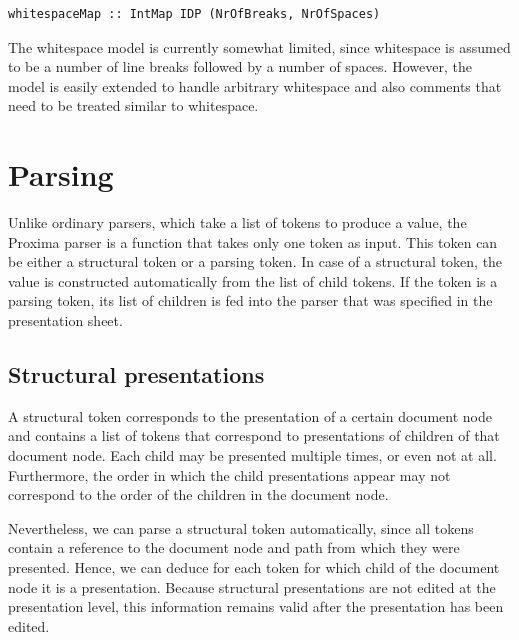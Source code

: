 \documentclass[12pt]{article}
\begin{document}
\begin{footnotesize}
\begin{verbatim}
whitespaceMap :: IntMap IDP (NrOfBreaks, NrOfSpaces)
\end{verbatim}
\end{footnotesize}

The whitespace model is currently somewhat limited, since whitespace is assumed to be a number of line breaks followed by a number of spaces. However, the model is easily extended to handle arbitrary whitespace and also comments that need to be treated similar to whitespace.






%
\section{Parsing}\label{sect:parser}
%

Unlike ordinary parsers, which take a list of tokens to produce a value, the Proxima parser is a function that takes only one token as input. This token can be either a structural token or a parsing token. In case of a structural token, the value is constructed automatically from the list of child tokens. If the token is a parsing token, its list of children is fed into the parser that was specified in the presentation sheet.

\subsection{Structural presentations}\label{subsect:parsingStructural}

A structural token corresponds to the presentation of a certain document node and contains a list of tokens that correspond to presentations of children of that document node. Each child may be presented multiple times, or even not at all. Furthermore, the order in which the child presentations appear may not correspond to the order of the children in the document node.

Nevertheless, we can parse a structural token automatically, since all tokens contain a  reference to the document node and path from which they were presented. Hence, we can deduce for each token for which child of the document node it is a presentation. Because structural presentations are not edited at the presentation level, this information remains valid after the presentation has been edited. 
\end{document}
